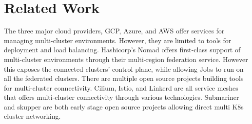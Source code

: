 
\chapter{Related Work}

%
%
%
%
%
%
%
%
%
%
%
%
The three major cloud providers, GCP, Azure, and AWS offer services for
managing multi-cluster environments. However, they are limited to tools for
deployment and load balancing.   
Hashicorp's Nomad offers first-class support of multi-cluster environments
through their multi-region federation service. However this exposes the
connected clusters' control plane, while allowing Jobs to run on all the
federated clusters. 
There are multiple open source projects building tools for multi-cluster
connectivity. Cilium, Istio, and Linkerd are all service meshes that offers
multi-cluster connectivity through various technologies.
Submariner and skupper are both early stage open source projects allowing
direct multi K8s cluster networking. 

